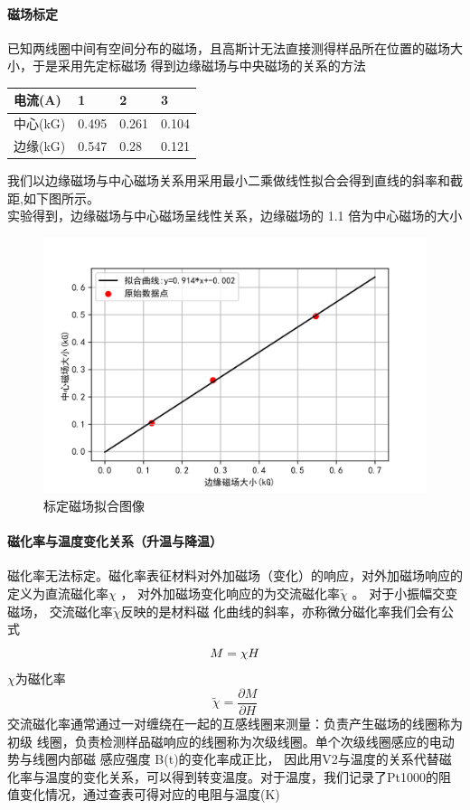 \documentclass{ctexart}                                     %
\theoremstyle{ansstyle}
\begin{document}
\paragraph[short]{磁场标定}  已知两线圈中间有空间分布的磁场，且高斯计无法直接测得样品所在位置的磁场大小，于是采用先定标磁场
得到边缘磁场与中央磁场的关系的方法
\begin{table}[H]
    \centering
    \begin{tabular}{@{}llll@{}}
        \toprule
        电流(A)  & 1     & 2     & 3     \\ \midrule
        中心(kG) & 0.495 & 0.261 & 0.104 \\
        边缘(kG) & 0.547 & 0.28  & 0.121 \\ \bottomrule
    \end{tabular}
\end{table}
我们以边缘磁场与中心磁场关系用采用最小二乘做线性拟合会得到直线的斜率和截距,如下图所示。
\\
实验得到，边缘磁场与中心磁场呈线性关系，边缘磁场的 1.1 倍为中心磁场的大小
\begin{figure}[H]
    \centering
    \caption{标定磁场拟合图像}

    \includegraphics[width=0.75\linewidth]{./png/q1.png}
\end{figure}
\paragraph{磁化率与温度变化关系（升温与降温）} 磁化率无法标定。磁化率表征材料对外加磁场（变化）的响应，对外加磁场响应的定义为直流磁化率$ \chi $ ，
对外加磁场变化响应的为交流磁化率$ \widetilde{\chi}  $ 。 对于小振幅交变磁场， 交流磁化率$ \widetilde{\chi}  $反映的是材料磁
化曲线的斜率，亦称微分磁化率我们会有公式
\begin{equation}
    \centering
    M=\chi H
\end{equation}
$ \chi $为磁化率
\begin{equation}
    \widetilde{\chi} =\frac{\partial M}{\partial H}
\end{equation}
交流磁化率通常通过一对缠绕在一起的互感线圈来测量：负责产生磁场的线圈称为初级
线圈，负责检测样品磁响应的线圈称为次级线圈。单个次级线圈感应的电动势与线圈内部磁
感应强度 B(t)的变化率成正比，
因此用V2与温度的关系代替磁化率与温度的变化关系，可以得到转变温度。对于温度，我们记录了Pt1000的阻值变化情况，通过查表可得对应的电阻与温度(K)\\
\end{document}
